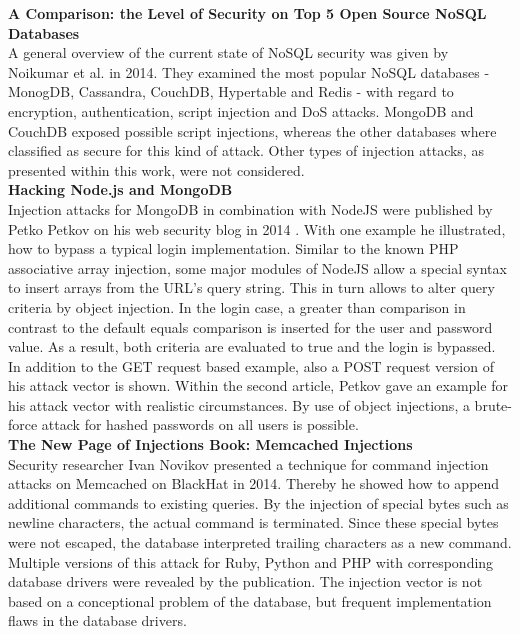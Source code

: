 \textbf{A Comparison: the Level of Security on Top 5 Open Source NoSQL Databases} \cite{Noiumkar:2014} \\
A general overview of the current state of NoSQL security was given by Noikumar et al. in 2014. They examined the most popular NoSQL databases - MonogDB, Cassandra, CouchDB, Hypertable and Redis - with regard to encryption, authentication, script injection and DoS attacks. MongoDB and CouchDB exposed possible script injections, whereas the other databases where classified as secure for this kind of attack. Other types of injection attacks, as presented within this work, were not considered. \\

\textbf{Hacking Node.js and MongoDB}\cite{Petkov:2014a, Petkov:2014b} \\
Injection attacks for MongoDB in combination with NodeJS were published by Petko Petkov on his web security blog in 2014 \cite{Petkov:2014a, Petkov:2014b}. With one example he illustrated, how to bypass a typical login implementation. Similar to the known PHP associative array injection, some major modules of NodeJS allow a special syntax to insert arrays from the URL's query string. This in turn allows to alter query criteria by object injection. In the login case, a greater than comparison in contrast to the default equals comparison is inserted for the user and password value. As a result, both criteria are evaluated to true and the login is bypassed. In addition to the GET request based example, also a POST request version of his attack vector is shown. Within the second article, Petkov gave an example for his attack vector with realistic circumstances. By use of object injections, a brute-force attack for hashed passwords on all users is possible.\\

\textbf{The New Page of Injections Book: Memcached Injections} \cite{Novikov:2014} \\
Security researcher Ivan Novikov presented a technique for command injection attacks on Memcached on BlackHat in 2014. Thereby he showed how to append additional commands to existing queries. By the injection of special bytes such as newline characters, the actual command is terminated. Since these special bytes were not escaped, the database interpreted trailing characters as a new command. Multiple versions of this attack for Ruby, Python and PHP with corresponding database drivers were revealed by the publication. The injection vector is not based on a conceptional problem of the database, but frequent implementation flaws in the database drivers. \\

